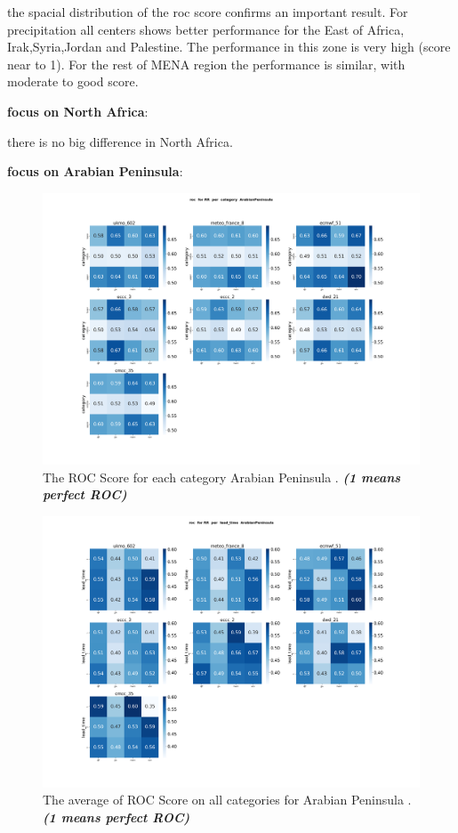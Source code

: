 the spacial distribution of the roc score confirms an important result. For precipitation all centers shows better performance for the East of Africa, Irak,Syria,Jordan and Palestine. The performance in this zone is very high (score near to 1). For the rest of MENA region the performance is similar, with moderate to good score.

\vspace{1.5cm}
\textbf{focus on North Africa}:

there is no big difference in North Africa.


\vspace{1.5cm}
\textbf{focus on Arabian Peninsula}:

\begin{figure}[H]
    \centering
    \includegraphics[scale=0.25]{plots/prob/roc/roc_RR_category_ArabianPeninsula.png}
    \caption{The ROC Score for each category Arabian Peninsula . \textbf{\textit{(1 means perfect ROC)}}}
\end{figure}


\begin{figure}[H]
    \centering
    \includegraphics[scale=0.25]{plots/prob/roc/roc_RR_lead_time_ArabianPeninsula.png}
    \caption{The average of  ROC Score on all categories for Arabian Peninsula . \textbf{\textit{(1 means perfect ROC)}}}
\end{figure}


